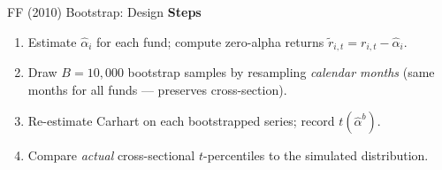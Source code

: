\documentclass[10pt, aspectratio=169]{beamer}
\begin{document}
\begin{frame}{FF (2010) Bootstrap: Design}
  \textbf{Steps}
  \begin{enumerate}\itemsep3pt
    \item Estimate $\hat{\alpha}_i$ for each fund; compute zero-alpha returns
          $\tilde{r}_{i,t} = r_{i,t} - \hat{\alpha}_i$.
    \item Draw $B = 10{,}000$ bootstrap samples by resampling \emph{calendar months}
          (same months for all funds — preserves cross-section).
    \item Re-estimate Carhart on each bootstrapped series; record $t(\hat{\alpha}^b)$.
    \item Compare \emph{actual} cross-sectional $t$-percentiles to the simulated distribution.
  \end{enumerate}
  \vspace{6pt}
\end{frame}
\end{document}
